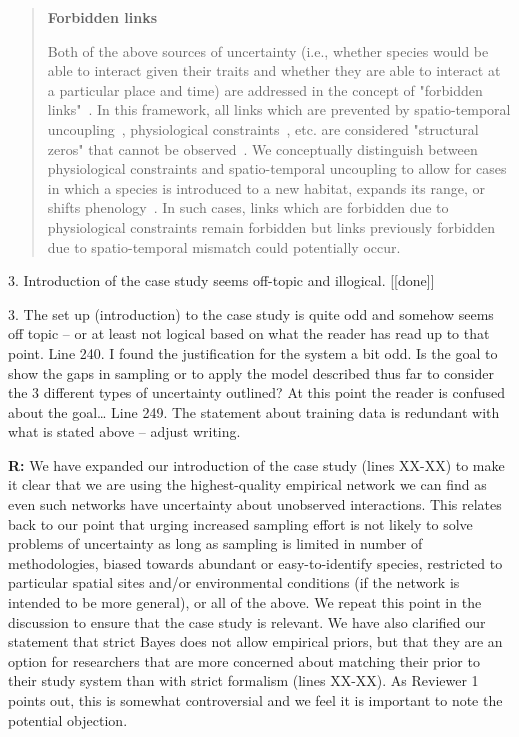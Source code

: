 \documentclass[12pt]{letter}
\newenvironment{refquote}{\bigskip \begin{it}}{\end{it}\smallskip}
\begin{document}
			\begin{quotation}

        \textbf{Forbidden links}

            Both of the above sources of uncertainty (i.e., whether species would be able to interact given their traits and whether they are able to interact at a particular place and time) are addressed in the concept of "forbidden links"~\citep{Jordano2016}. In this framework, all links which are prevented by spatio-temporal uncoupling~\citep{Jordano1987}, physiological constraints~\citep{Jordano1987}, etc. are considered "structural zeros" that cannot be observed~\citep{Jordano2016}. We conceptually distinguish between physiological constraints and spatio-temporal uncoupling to allow for cases in which a species is introduced to a new habitat, expands its range, or shifts phenology~\citep{Gravel2013}. In such cases, links which are forbidden due to physiological constraints remain forbidden but links previously forbidden due to spatio-temporal mismatch could potentially occur. 

      \end{quotation}


	3. Introduction of the case study seems off-topic and illogical. [[done]]

		\begin{refquote}
		3.      The set up (introduction) to the case study is quite odd and somehow seems off topic – or at least not logical based on what the reader has read up to that point.
		\medskip
		Line 240.  I found the justification for the system a bit odd.  Is the goal to show the gaps in sampling or to apply the model described thus far to consider the 3 different types of uncertainty outlined?  At this point the reader is confused about the goal…
		\medskip
		Line 249.  The statement about training data is redundant with what is stated above – adjust writing.
		\end{refquote}

		\textbf{R:} We have expanded our introduction of the case study (lines XX-XX) to make it clear that we are using the highest-quality empirical network we can find as even such networks have uncertainty about unobserved interactions. This relates back to our point that urging increased sampling effort is not likely to solve problems of uncertainty as long as sampling is limited in number of methodologies, biased towards abundant or easy-to-identify species, restricted to particular spatial sites and/or environmental conditions (if the network is intended to be more general), or all of the above. We repeat this point in the discussion to ensure that the case study is relevant. We have also clarified our statement that strict Bayes does not allow empirical priors, but that they are an option for researchers that are more concerned about matching their prior to their study system than with strict formalism (lines XX-XX). As Reviewer 1 points out, this is somewhat controversial and we feel it is important to note the potential objection.
\end{document}
